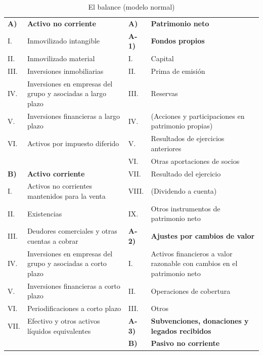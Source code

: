 \documentclass[11pt]{article}
\begin{document}
\begin{table}[H]
\centering
\caption{El balance (modelo normal)}\label{tab:modelo-balance}
\footnotesize
\renewcommand{\arraystretch}{1.12}
\begin{tabular}{>{\raggedleft\arraybackslash}p{0.75cm}>{\raggedright\arraybackslash}p{5.6cm}>{\raggedleft\arraybackslash}p{0.85cm}>{\raggedright\arraybackslash}p{5.6cm}}
\toprule
\rowcolor{tceeazulpalido}\multicolumn{2}{l}{\textbf{Activo}} & \multicolumn{2}{l}{\textbf{Patrimonio neto y pasivo}} \\
\midrule
\textbf{A)} & \textbf{Activo no corriente} & \textbf{A)} & \textbf{Patrimonio neto} \\
I. & Inmovilizado intangible & \textbf{A-1)} & \textbf{Fondos propios} \\
II. & Inmovilizado material & I. & Capital \\
III. & Inversiones inmobiliarias & II. & Prima de emisión \\
IV. & Inversiones en empresas del grupo y asociadas a largo plazo & III. & Reservas \\
V. & Inversiones financieras a largo plazo & IV. & (Acciones y participaciones en patrimonio propias) \\
VI. & Activos por impuesto diferido & V. & Resultados de ejercicios anteriores \\
 &  & VI. & Otras aportaciones de socios \\
\textbf{B)} & \textbf{Activo corriente} & VII. & Resultado del ejercicio \\
I. & Activos no corrientes mantenidos para la venta & VIII. & (Dividendo a cuenta) \\
II. & Existencias & IX. & Otros instrumentos de patrimonio neto \\
III. & Deudores comerciales y otras cuentas a cobrar & \textbf{A-2)} & \textbf{Ajustes por cambios de valor} \\
IV. & Inversiones en empresas del grupo y asociadas a corto plazo & I. & Activos financieros a valor razonable con cambios en el patrimonio neto \\
V. & Inversiones financieras a corto plazo & II. & Operaciones de cobertura \\
VI. & Periodificaciones a corto plazo & III. & Otros \\
VII. & Efectivo y otros activos líquidos equivalentes & \textbf{A-3)} & \textbf{Subvenciones, donaciones y legados recibidos} \\
 &  & \textbf{B)} & \textbf{Pasivo no corriente} \\

\end{tabular}
\end{table}
\end{document}
